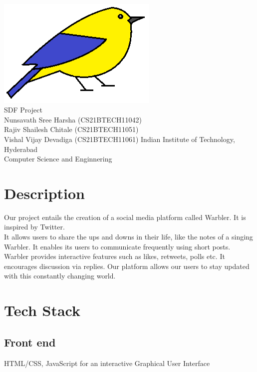 \documentclass[journal,12pt,onecolumn]{IEEEtran}
\begin{document}
\begin{titlepage}
    \begin{center}
        \vspace*{1 cm}
         \\
        \vspace*{1 cm}
        \includegraphics[width=0.3\linewidth]{./media/logo.png}\\[1ex]
        \vspace{1 cm}
        \LARGE {SDF Project} \\
        \vspace{1 cm}
        \large {Nunsavath Sree Harsha (CS21BTECH11042) \\ Rajiv Shailesh Chitale (CS21BTECH11051) \\ Vishal Vijay Devadiga (CS21BTECH11061)}
        \vfill
        \large Indian Institute of Technology, Hyderabad \\ Computer Science and Enginnering
    \end{center}
\end{titlepage}
%
\section*{\textbf{Description}}
\noindent Our project entails the creation of a social media platform called {\color{blue}Warbler}. 
It is inspired by Twitter. \\
It allows users to share the ups and downs in their life, like the notes of a singing Warbler.
It enables its users to communicate frequently using short posts. 
Warbler provides interactive features such as likes, retweets, polls etc. 
It encourages discussion via replies. 
Our platform allows our users to stay updated with this constantly changing world. 

\section*{\textbf{Tech Stack}}
\subsection*{\textbf{Front end}} HTML/CSS, JavaScript for an interactive Graphical User Interface
\end{document}
